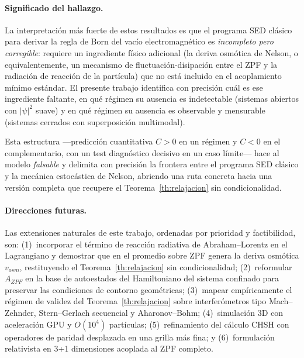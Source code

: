 \documentclass[11pt,a4paper]{article}
\begin{document}
\paragraph{Significado del hallazgo.}
La interpretación más fuerte de estos resultados es que el programa
SED clásico para derivar la regla de Born del vacío electromagnético
es \emph{incompleto pero corregible}: requiere un ingrediente físico
adicional (la deriva osmótica de Nelson, o equivalentemente, un
mecanismo de fluctuación-disipación entre el ZPF y la radiación de
reacción de la partícula) que no está incluido en el acoplamiento
mínimo estándar. El presente trabajo identifica con precisión cuál es
ese ingrediente faltante, en qué régimen su ausencia es indetectable
(sistemas abiertos con $|\psi|^2$ suave) y en qué régimen su ausencia
es observable y mensurable (sistemas cerrados con superposición
multimodal).

Esta estructura ---predicción cuantitativa $C>0$ en un régimen y
$C<0$ en el complementario, con un test diagnóstico decisivo en un
caso límite--- hace al modelo \emph{falsable} y delimita con precisión
la frontera entre el programa SED clásico y la mecánica estocástica
de Nelson, abriendo una ruta concreta hacia una versión completa que
recupere el Teorema~\ref{th:relajacion} sin condicionalidad.

\paragraph{Direcciones futuras.}
Las extensiones naturales de este trabajo, ordenadas por prioridad y
factibilidad, son: (1)~incorporar el término de reacción radiativa de
Abraham--Lorentz en el Lagrangiano y demostrar que en el promedio
sobre ZPF genera la deriva osmótica $v_{osm}$, restituyendo el
Teorema~\ref{th:relajacion} sin condicionalidad; (2)~reformular
$A_{ZPF}$ en la base de autoestados del Hamiltoniano del sistema
confinado para preservar las condiciones de contorno geométricas;
(3)~mapear empíricamente el régimen de validez del
Teorema~\ref{th:relajacion} sobre interferómetros tipo Mach--Zehnder,
Stern--Gerlach secuencial y Aharonov--Bohm; (4)~simulación 3D con
aceleración GPU y $O(10^4)$ partículas; (5)~refinamiento del cálculo
CHSH con operadores de paridad desplazada en una grilla más fina; y
(6)~formulación relativista en 3+1 dimensiones acoplada al ZPF
completo.
\end{document}
